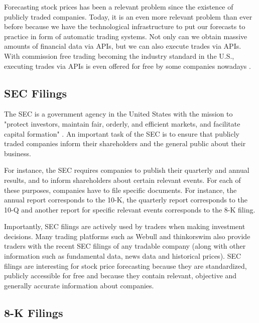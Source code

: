 \documentclass{article}
\begin{document}
	Forecasting stock prices has been a relevant problem since the existence of publicly traded companies. Today, it is an even more relevant problem than ever before because we have the technological infrastructure to put our forecasts to practice in form of automatic trading systems. Not only can we obtain massive amounts of financial data via APIs, but we can also execute trades via APIs. With commission free trading becoming the industry standard in the U.S., executing trades via APIs is even offered for free by some companies nowadays \cite{noauthor_alpaca_nodate}. 

	\subsection{SEC Filings}
	
	The SEC is a government agency in the United States with the mission to "protect investors, maintain fair, orderly, and efficient markets, and facilitate capital formation" \cite{noauthor_sec.gov_nodate}. An important task of the SEC is to ensure that publicly traded companies inform their shareholders and the general public about their business.
	
	For instance, the SEC requires companies to publish their quarterly and annual results, and to inform shareholders about certain relevant events. For each of these purposes, companies have to file specific documents. For instance, the annual report corresponds to the 10-K, the quarterly report corresponds to the 10-Q and another report for specific relevant events corresponds to the 8-K filing.
	
	Importantly, SEC filings are actively used by traders when making investment decisions. Many trading platforms such as Webull and thinkorswim also provide traders with the recent SEC filings of any tradable company (along with other information such as fundamental data, news data and historical prices). SEC filings are interesting for stock price forecasting because they are standardized, publicly accessible for free and because they contain relevant, objective and generally accurate information about companies.
	
	
	\subsection{8-K Filings}
	
\end{document}
